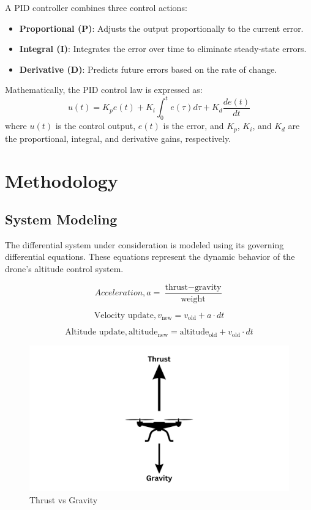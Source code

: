 \documentclass[a4paper,12pt]{article}
\begin{document}
A PID controller combines three control actions:

\begin{itemize}
    \item \textbf{Proportional (P)}: Adjusts the output proportionally to the current error.
    \item \textbf{Integral (I)}: Integrates the error over time to eliminate steady-state errors.
    \item \textbf{Derivative (D)}: Predicts future errors based on the rate of change.
\end{itemize}

Mathematically, the PID control law is expressed as:
\[
u(t) = K_p e(t) + K_i \int_0^t e(\tau) d\tau + K_d \frac{de(t)}{dt}
\]
where $u(t)$ is the control output, $e(t)$ is the error, and $K_p$, $K_i$, and $K_d$ are the proportional, integral, and derivative gains, respectively.

\section{Methodology}

\subsection{System Modeling}

The differential system under consideration is modeled using its governing differential equations. These equations represent the dynamic behavior of the drone's altitude control system.



\[ Acceleration, a = \frac{\text{thrust} - \text{gravity}}{\text{weight}} \]


\[ \text{Velocity update}, v_{\text{new}} = v_{\text{old}} + a \cdot dt \]


\[ \text{Altitude update}, \text{altitude}_{\text{new}} = \text{altitude}_{\text{old}} + v_{\text{old}} \cdot dt \]

\begin{figure}
    \centering
    \includegraphics[width=1\linewidth,height=0.6
    \linewidth]{photos/drone.png}
    \caption{Thrust vs Gravity}
    \label{fig:enter-label}
    
\end{figure}
\end{document}
